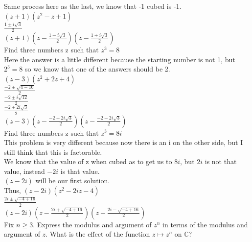 \documentclass[12pt]{article}
\begin{document}
Same process here as the last, we know that -1 cubed is -1.\\

$(z+1)(z^2-z+1)$\\

$\frac{1 \pm i\sqrt{3}}{2}$\\

$(z+1)(z - \frac{1 - i\sqrt{3}}{2})(z - \frac{1 + i\sqrt{3}}{2})$\\

 Find three numbers z such that $z^3 = 8$\\

Here the answer is a little different because the starting number is not 1, but $2^3 = 8$ so we know that one of the answers should be 2.\\


$(z-3)(z^2+2z+4)$\\

$\frac{-2 \pm \sqrt{4 - 16}}{2}$\\
$\frac{-2 \pm i\sqrt{12}}{2}$\\
$\frac{-2 \pm 2i\sqrt{3}}{2}$\\


$(z-3)(z - \frac{-2 + 2i\sqrt{3}}{2})(z - \frac{-2 - 2i\sqrt{3}}{2})$\\

 Find three numbers z such that $z^3 = 8i$\\

This problem is very different because now there is an i on the other side, but I still think that this is factorable.\\

We know that the value of z when cubed as to get us to $8i$, but $2i$ is not that value, instead $-2i$ is that value.\\

$(z-2i)$ will be our first solution.\\

Thus,
$(z-2i)(z^2 - 2iz - 4)$\\

$\frac{2i \pm \sqrt{-4 + 16}}{2}$\\

$(z-2i)(z - \frac{2i + \sqrt{-4 + 16}}{2})(z - \frac{2i - \sqrt{-4 + 16}}{2})$\\



Fix $n \geq 3$. Express the modulus and argument of $z^n$ in terms of the modulus and argument of $z$. What is the effect of the function $z \mapsto z^n$ on $\mathbb{C}$?\\
\end{document}
